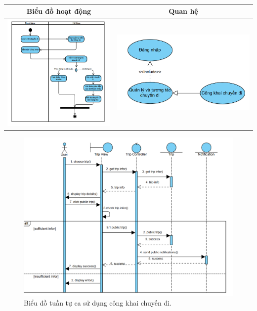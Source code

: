 \noindent 
\begin{tabular}{| c | c |}
    \hline
    \textbf{Biểu đồ hoạt động} & \textbf{Quan hệ} \\ 
    \hline
    \includegraphics[width=0.5\linewidth]{figures/c3/3-3-15-ad.png} 
    & 
    \includegraphics[width=0.45\linewidth]{figures/c3/3-3-15-rd.png} \\ 
    \hline
\end{tabular}

\vspace{0.8cm}

\begin{figure}[H]
    \centering  
    \includegraphics[width=1\textwidth]{figures/c3/3-3-15-sd.png}
    \caption{Biểu đồ tuần tự ca sử dụng công khai chuyến đi.}
    \label{fig:3-3-15-sequence-diagram}
\end{figure}